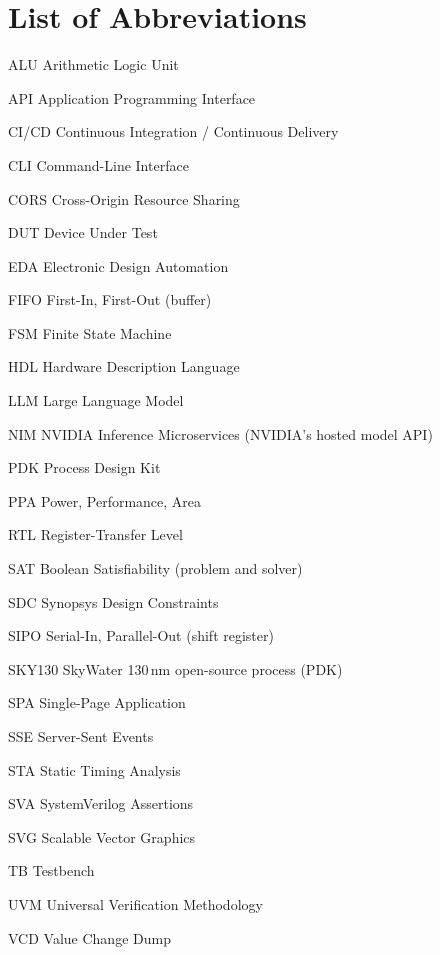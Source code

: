\chapter*{\Large List of Abbreviations}

\begin{abbrv}
\item[ALU] Arithmetic Logic Unit
\item[API] Application Programming Interface
\item[CI/CD] Continuous Integration / Continuous Delivery
\item[CLI] Command-Line Interface
\item[CORS] Cross-Origin Resource Sharing
\item[DUT] Device Under Test
\item[EDA] Electronic Design Automation
\item[FIFO] First-In, First-Out (buffer)
\item[FSM] Finite State Machine
\item[HDL] Hardware Description Language
\item[LLM] Large Language Model
\item[NIM] NVIDIA Inference Microservices (NVIDIA's hosted model API)
\item[PDK] Process Design Kit
\item[PPA] Power, Performance, Area
\item[RTL] Register-Transfer Level
\item[SAT] Boolean Satisfiability (problem and solver)
\item[SDC] Synopsys Design Constraints
\item[SIPO] Serial-In, Parallel-Out (shift register)
\item[SKY130] SkyWater 130\,nm open-source process (PDK)
\item[SPA] Single-Page Application
\item[SSE] Server-Sent Events
\item[STA] Static Timing Analysis
\item[SVA] SystemVerilog Assertions
\item[SVG] Scalable Vector Graphics
\item[TB] Testbench
\item[UVM] Universal Verification Methodology
\item[VCD] Value Change Dump
\end{abbrv}
